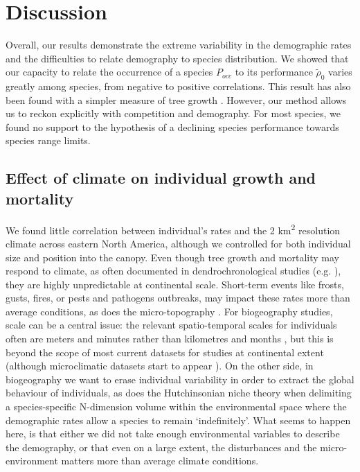 



\section{Discussion}

Overall, our results demonstrate the extreme variability in the demographic rates and the difficulties to relate demography to species distribution. We showed that our capacity to relate the occurrence of a species $ P_{occ} $ to its performance $ \tilde \rho_0 $ varies greatly among species, from negative to positive correlations. This result has also been found with a simpler measure of tree growth \citep{McGill2012}. However, our method allows us to reckon explicitly with competition and demography. For most species, we found no support to the hypothesis of a declining species performance towards species range limits.

\subsection{Effect of climate on individual growth and mortality}
We found little correlation between individual's rates and the 2 km\textsuperscript{2} resolution climate across eastern North America, although we controlled for both individual size and position into the canopy. Even though tree growth and mortality may respond to climate, as often documented in dendrochronological studies (e.g. \citet{Aussenac2017}), they are highly unpredictable at continental scale. Short-term events like frosts, gusts, fires, or pests and pathogens outbreaks, may impact these rates more than average conditions, as does the micro-topography \citep{Loehle1996}. For biogeography studies, scale can be a central issue: the relevant spatio-temporal scales for individuals often are meters and minutes rather than kilometres and months \citep{Urban2016}, but this is beyond the scope of most current datasets for studies at continental extent (although microclimatic datasets start to appear \citep{Lembrechts2019}). On the other side, in biogeography we want to erase individual variability in order to extract the global behaviour of individuals, as does the Hutchinsonian niche theory when delimiting a species-specific N-dimension volume within the environmental space where the demographic rates allow a species to remain `indefinitely'. What seems to happen here, is that either we did not take enough environmental variables to describe the demography, or that even on a large extent, the disturbances and the micro-environment matters more than average climate conditions.

